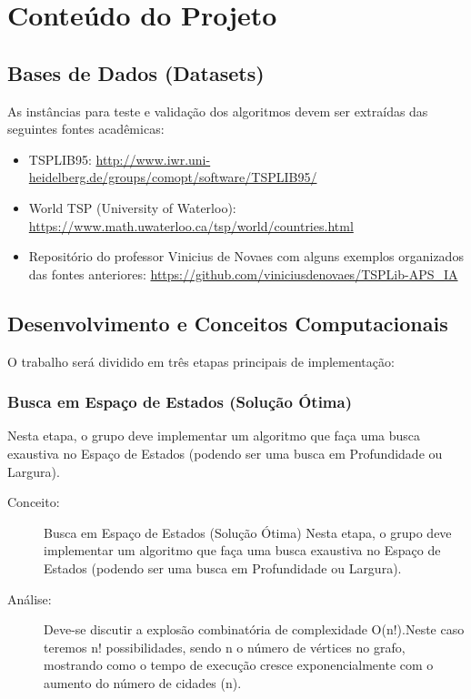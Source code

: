 \chapter{Conteúdo do Projeto}

\section{Bases de Dados (Datasets)}

As instâncias para teste e validação dos algoritmos devem ser extraídas das seguintes fontes acadêmicas:

\begin{itemize}
\item TSPLIB95: \url{http://www.iwr.uni-heidelberg.de/groups/comopt/software/TSPLIB95/}
\item World TSP (University of Waterloo): 
\url{https://www.math.uwaterloo.ca/tsp/world/countries.html}
\item Repositório do professor Vinicius de Novaes com alguns exemplos organizados das fontes anteriores: \url{https://github.com/viniciusdenovaes/TSPLib-APS_IA}
\end{itemize}


\section{Desenvolvimento e Conceitos Computacionais}

O trabalho será dividido em três etapas principais de implementação:



\subsection{Busca em Espaço de Estados (Solução Ótima)}

Nesta etapa, o grupo deve implementar um algoritmo que faça uma busca exaustiva no Espaço de Estados (podendo ser uma busca em Profundidade ou Largura).

\begin{description}
    \item[Conceito:] Busca em Espaço de Estados (Solução Ótima) Nesta etapa, o grupo deve implementar um algoritmo que faça uma busca exaustiva no Espaço de Estados (podendo ser uma busca em Profundidade ou Largura).
    \item[Análise:] Deve-se discutir a explosão combinatória de complexidade O(n!).Neste caso teremos n! possibilidades, sendo n o número de vértices no grafo, mostrando como o tempo de execução cresce exponencialmente com o aumento do número de cidades (n).

\end{description}








